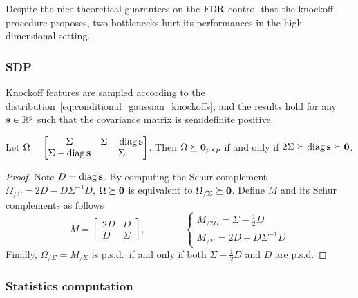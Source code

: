 Despite the nice theoretical guarantees on the $\text{FDR}$ control that the knockoff procedure proposes,
two bottlenecks hurt its performances in the high dimensional setting.

\subsubsection{SDP}\label{subsubsec:bot_sdp}

Knockoff features are sampled according to the distribution~\ref{eq:conditional_gaussian_knockoffs},
and the results hold for any $\mathbf{s} \in \mathbb{R}^p$ such that the covariance matrix is semidefinite positive.

\begin{proposition}
    Let $\Omega = \begin{bmatrix}
                      \Sigma & \Sigma - \operatorname*{diag} \mathbf{s}\\
                      \Sigma - \operatorname*{diag} \mathbf{s} & \Sigma
    \end{bmatrix}$.
    Then $\Omega \succeq \mathbf{0}_{p \times p}$ if and only if $2\Sigma \succeq \operatorname*{diag} \mathbf{s} \succeq \mathbf{0}$.
\end{proposition}

\begin{proof}
    Note $D = \operatorname*{diag}\mathbf{s}$.
    By computing the Schur complement~\cite{schur_complement}
    $\Omega_{/\Sigma} = 2D - D\Sigma^{-1}D$,
    $\Omega \succeq \mathbf{0}$ is equivalent to $\Omega_{/\Sigma} \succeq \mathbf{0}$.
    Define $M$ and its Schur complements as follows
    \begin{equation*}
        M = \begin{bmatrix}
            2D & D\\
            D & \Sigma
        \end{bmatrix}
        ,\qquad\qquad
        \begin{cases*}
            M_{/2D} = \Sigma - \frac{1}{2}D\\
            M_{/\Sigma} = 2D - D\Sigma^{-1}D
        \end{cases*}
    \end{equation*}
    Finally, $\Omega_{/\Sigma} = M_{/\Sigma}$ is p.s.d.\ if and only if both $\Sigma - \frac{1}{2}D$ and $D$ are p.s.d.
\end{proof}

\subsubsection{Statistics computation}\label{subsubsec:bot_stats}

